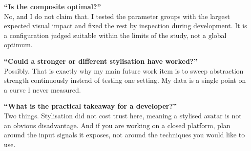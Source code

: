 \documentclass[11pt,a4paper]{article}
\begin{document}
\textbf{``Is the composite optimal?''}\\
No, and I do not claim that. I tested the parameter groups with the largest expected visual impact and fixed the rest by inspection during development. It is a configuration judged suitable within the limits of the study, not a global optimum.

\textbf{``Could a stronger or different stylisation have worked?''}\\
Possibly. That is exactly why my main future work item is to sweep abstraction strength continuously instead of testing one setting. My data is a single point on a curve I never measured.

\textbf{``What is the practical takeaway for a developer?''}\\
Two things. Stylisation did not cost trust here, meaning a stylised avatar is not an obvious disadvantage. And if you are working on a closed platform, plan around the input signals it exposes, not around the techniques you would like to use.
\end{document}
